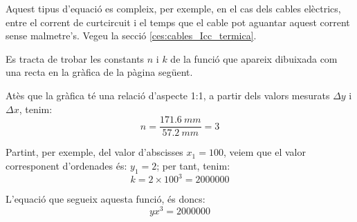 Aquest tipus d'equació es compleix, per exemple, en el cas dels cables elèctrics, entre el corrent de curtcircuit i el temps que el cable pot aguantar aquest corrent sense malmetre's. Vegeu la secció \vref{ces:cables_Icc_termica}.

	
\begin{exemple}[\ConstantsEscalaLogLog{}]
	\addcontentsxms{\ConstantsEscalaLogLog}
    Es tracta de trobar les constants $n$ i $k$ de la funció que apareix dibuixada com una recta en la gràfica de la pàgina següent.

     Atès que la gràfica té una relació d'aspecte 1:1, a partir dels valors mesurats $\Delta{}y$ i $\Delta{}x$, tenim:
    \[
        n = \frac{\qty{171,6}{mm}}{\qty{57,2}{mm}} = 3
    \]

    Partint, per exemple, del valor d'abscisses $x_1=100$, veiem que el valor corresponent d'ordenades és: $y_1=2$;  per tant, tenim:
    \[
        k = 2 \times 100^3  = \num{2000000}
    \]

    L'equació que segueix aquesta funció, és doncs:
    \[
        y x^3 = \num{2000000}
    \]

   \begin{center}
        
   \end{center}

\end{exemple}
